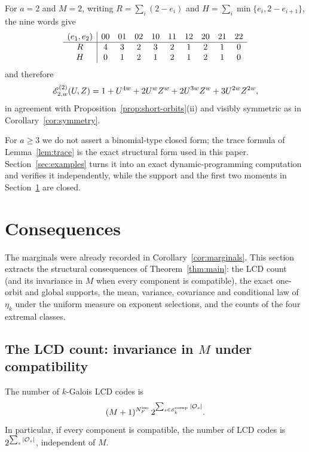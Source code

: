 \begin{example}\label{ex:a2M2}
For $a=2$ and $M=2$, writing $R=\sum_i(2-e_i)$ and
$H=\sum_i\min\{e_i,2-e_{i+1}\}$, the nine words give
\[
\setlength{\tabcolsep}{4pt}
\begin{array}{c|ccccccccc}
(e_1,e_2)&00&01&02&10&11&12&20&21&22\\ \hline
R&4&3&2&3&2&1&2&1&0\\
H&0&1&2&1&2&1&2&1&0
\end{array}
\]
and therefore
\[
\mathscr E_{2,w}^{(2)}(U,Z)
 =1+U^{4w}+2U^wZ^w+2U^{3w}Z^w+3U^{2w}Z^{2w},
\]
in agreement with Proposition~\ref{prop:short-orbits}(ii) and visibly symmetric
as in Corollary~\ref{cor:symmetry}.
\end{example}

For $a\geq3$ we do not assert a binomial-type closed form; the trace formula
of Lemma~\ref{lem:trace} is the exact structural form used in this paper.
Section~\ref{sec:examples} turns it into an exact dynamic-programming
computation and verifies it independently, while the support and the first
two moments in Section~\ref{sec:consequences} are closed.

\section{Consequences}\label{sec:consequences}

The marginals were already recorded in Corollary~\ref{cor:marginals}.  This
section extracts the structural consequences of Theorem~\ref{thm:main}: the
LCD count (and its invariance in $M$ when every component is compatible), the exact one-orbit and global supports,
the mean, variance, covariance and conditional law of $\eta_k$ under the
uniform measure on exponent selections, and the counts of the four extremal
classes.

\subsection{The LCD count: invariance in \texorpdfstring{$M$}{M} under compatibility}
\label{sec:lcd}

\begin{proposition}\label{prop:lcd-count}
The number of $k$-Galois LCD codes is
\[
(M+1)^{N_F^{\mathrm{inc}}}\,
2^{\sum_{s\in\mathcal{S}_k^{\mathrm{comp}}}|\mathcal O_s|}.
\]
In particular, if every component is compatible, the number of LCD codes is
$2^{\sum_s|\mathcal O_s|}$, independent of $M$.
\end{proposition}

